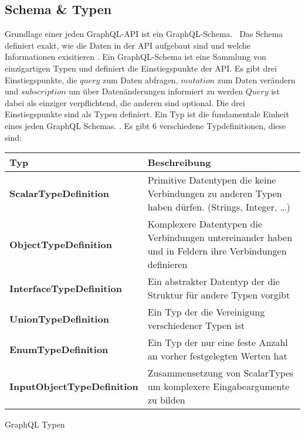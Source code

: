 \subsection{Schema \& Typen}
\label{schematypes}

Grundlage einer jeden GraphQL-API ist ein GraphQL-Schema.~\cite[vgl. Core Concepts]{graphqlspecification}
Das Schema definiert exakt, wie die Daten in der API aufgebaut sind und welche Informationen exisitieren \cite[vgl. 3.2 Schema]{graphqlspecification}.
Ein GraphQL-Schema ist eine Sammlung von einzigartigen Typen und definiert die Einstiegspunkte der API.
Es gibt drei Einstiegspunkte, die $query$ zum Daten abfragen, $mutation$ zum Daten verändern und $subscription$ um über Datenänderungen informiert zu werden \cite[vgl. 3.2.1 Root Operation Types]{graphqlspecification}
$Query$ ist dabei als einziger verpflichtend, die anderen sind optional. \cite[vgl. 3.2.1]{graphqlspecification}
Die drei Einstiegspunkte sind als Typen definiert.
Ein Typ ist die fundamentale Einheit eines jeden GraphQL Schemas. \cite[vgl. 3.4 Types]{graphqlspecification}.
\newpage
Es gibt 6 verschiedene Typdefinitionen, diese sind:

\begin{center}
    \begin{table}[!ht]
        \begin{tabularx}{\textwidth}{|C|C|}
            \hline
            \textbf{ Typ } & \textbf{ Beschreibung} \\
            \hline
            \textbf{ ScalarTypeDefinition } & Primitive Datentypen die keine Verbindungen zu anderen Typen haben dürfen. (Strings, Integer, \ldots) \\
            \hline
            \textbf{ ObjectTypeDefinition  } & Komplexere Datentypen die Verbindungen untereinander haben und in Feldern ihre Verbindungen definieren \\
            \hline
            \textbf{ InterfaceTypeDefinition } & Ein abstrakter Datentyp der die Struktur für andere Typen vorgibt \\
            \hline
            \textbf{ UnionTypeDefinition } & Ein Typ der die Vereinigung verschiedener Typen ist \\
            \hline
            \textbf{ EnumTypeDefinition } & Ein Typ der nur eine feste Anzahl an vorher festgelegten Werten hat \\
            \hline
            \textbf{ InputObjectTypeDefinition } & Zusammensetzung von ScalarTypes um komplexere Eingabeargumente zu bilden  \\
            \hline
        \end{tabularx}
    \end{table}
    \caption{GraphQL Typen}
    \cite[vgl. 3.4 Types]{graphqlspecification}
\end{center}

